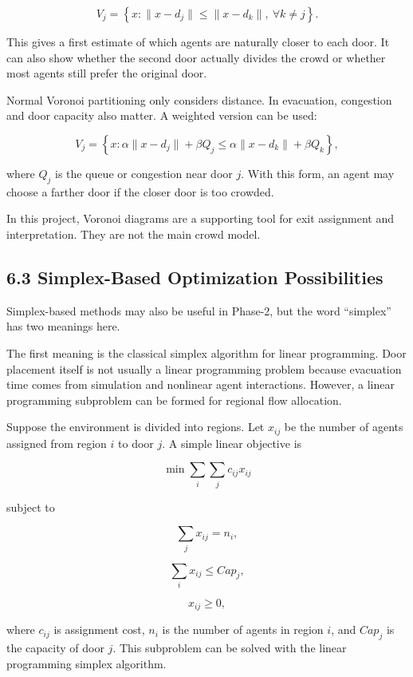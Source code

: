 \documentclass[
  11pt,
]{article}
\begin{document}
\[
V_j
=
\left\{
x : \|x-d_j\| \leq \|x-d_k\|,\ \forall k \neq j
\right\}.
\]

This gives a first estimate of which agents are naturally closer to each
door. It can also show whether the second door actually divides the
crowd or whether most agents still prefer the original door.

Normal Voronoi partitioning only considers distance. In evacuation,
congestion and door capacity also matter. A weighted version can be
used:

\[
V_j
=
\left\{
x :
\alpha \|x-d_j\| + \beta Q_j
\leq
\alpha \|x-d_k\| + \beta Q_k
\right\},
\]

where \(Q_j\) is the queue or congestion near door \(j\). With this
form, an agent may choose a farther door if the closer door is too
crowded.

In this project, Voronoi diagrams are a supporting tool for exit
assignment and interpretation. They are not the main crowd model.

\subsection{6.3 Simplex-Based Optimization
Possibilities}\label{simplex-based-optimization-possibilities}

Simplex-based methods may also be useful in Phase-2, but the word
``simplex'' has two meanings here.

The first meaning is the classical simplex algorithm for linear
programming. Door placement itself is not usually a linear programming
problem because evacuation time comes from simulation and nonlinear
agent interactions. However, a linear programming subproblem can be
formed for regional flow allocation.

Suppose the environment is divided into regions. Let \(x_{ij}\) be the
number of agents assigned from region \(i\) to door \(j\). A simple
linear objective is

\[
\min \sum_i \sum_j c_{ij}x_{ij}
\]

subject to

\[
\sum_j x_{ij} = n_i,
\]

\[
\sum_i x_{ij} \leq Cap_j,
\]

\[
x_{ij} \geq 0,
\]

where \(c_{ij}\) is assignment cost, \(n_i\) is the number of agents in
region \(i\), and \(Cap_j\) is the capacity of door \(j\). This
subproblem can be solved with the linear programming simplex algorithm.
\end{document}
